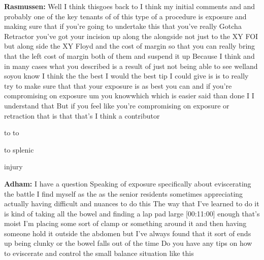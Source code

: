 \documentclass[
]{book}
\begin{document}
\textbf{Rasmussen:} Well I think thisgoes back to I think my initial comments
and and probably one of the key tenants of of this type of a procedure
is exposure and making sure that if you're going to undertake this that
you've really Gotcha Retractor you've got your incision up along the
alongside not just to the XY FOI but along side the XY Floyd and the
cost of margin so that you can really bring that the left cost of margin
both of them and suspend it up Because I think and in many cases what
you described is a result of just not being able to see welland soyou
know I think the the best I would the best tip I could give is is to
really try to make sure that that your exposure is as best you can and
if you're compromising on exposure um you knowwhich which is easier said
than done I I understand that But if you feel like you're compromising
on exposure or retraction that is that that's I think a contributor

to to

to splenic

injury

\textbf{Adham:} I have a question Speaking of exposure specifically about
eviscerating the battle I find myself as the as the senior residents
sometimes appreciating actually having difficult and nuances to do this
The way that I've learned to do it is kind of taking all the bowel and
finding a lap pad large {[}00:11:00{]} enough that's moist I'm placing some
sort of clamp or something around it and then having someone hold it
outside the abdomen but I've always found that it sort of ends up being
clunky or the bowel falls out of the time Do you have any tips on how to
eviscerate and control the small balance situation like this
\end{document}
